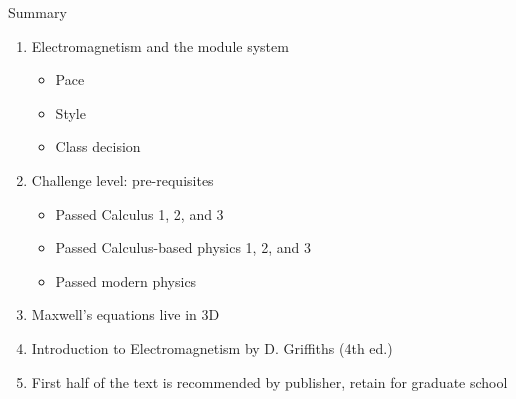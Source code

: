 \documentclass{beamer}
\begin{document}
\begin{frame}{Summary}
\begin{enumerate}
\item Electromagnetism and the module system
\begin{itemize}
\item Pace
\item Style
\item Class decision
\end{itemize}
\item Challenge level: pre-requisites
\begin{itemize}
\item Passed Calculus 1, 2, and 3
\item Passed Calculus-based physics 1, 2, and 3
\item Passed modern physics
\end{itemize}
\item Maxwell's equations live in 3D
\item \alert{Introduction to Electromagnetism by D. Griffiths (4th ed.)}
\item First half of the text is recommended by publisher, retain for graduate school
\end{enumerate}
\end{frame}
\end{document}
